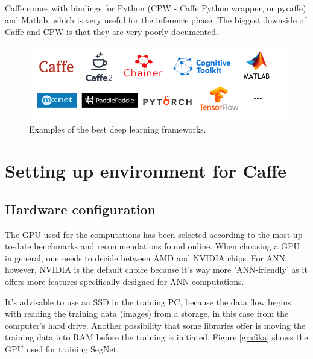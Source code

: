 Caffe comes with bindings for Python (CPW - Caffe Python wrapper, or pycaffe) and Matlab, which is very useful for the inference phase. The biggest downside of Caffe and CPW is that they are very poorly documented.

\vspace{5mm}
\begin{figure}[h]
	\begin{center}
		\includegraphics*[width=14cm, keepaspectratio]{obr/libraries.png}
	\end{center}
	\vspace{4mm}
	\caption{Examples of the best deep learning frameworks. \cite{nvidia_dev}} 
	\label{libraries}
\end{figure} 

\newpage
\section{Setting up environment for Caffe}

\subsection{Hardware configuration}

The GPU used for the computations has been selected according to the most up-to-date benchmarks and recommendations found online. When choosing a GPU in general, one needs to decide between AMD and NVIDIA chips. For ANN however, NVIDIA is the default choice because it's way more 'ANN-friendly' as it offers more features specifically designed for ANN computations. 

It's advisable to use an SSD in the training PC, because the data flow begins with reading the training data (images) from a storage, in this case from the computer's hard drive. Another possibility that some libraries offer is moving the training data into RAM before the training is initiated. Figure \ref{grafika} shows the GPU used for training SegNet.

